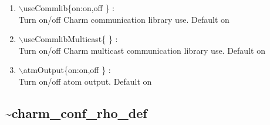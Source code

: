 \documentclass[12pt]{article}
\begin{document}
\begin{enumerate}
  \vspace{0.15in} 
  \item  $\backslash$useCommlib\{on:on,off \} : \\
  Turn on/off Charm communication library use. Default on
  \vspace{0.15in} 
  \item  $\backslash$useCommlibMulticast\{ \} : \\   
  \vspace{0.15in} 
  Turn on/off Charm multicast communication library use. Default on
  \item  $\backslash$atmOutput\{on:on,off \} : \\   
  Turn on/off atom output. Default on
\end{enumerate}

\newpage
\subsection*{\bf \~{ }charm\_conf\_rho\_def}
\end{document}

